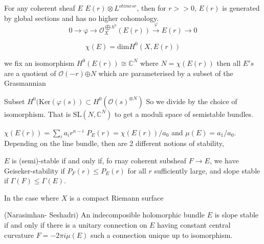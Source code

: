 For any coherent sheaf $E$  $E(r) \otimes L^{otimes r} $, 
then for $ r >> 0 $, $E(r) $ is generated by global sections and has no higher cohomology. 
\begin{equation}
    0 \rightarrow \mathrm{\varphi} \rightarrow \mathcal{O} _X ^{\bigoplus h^0} (E(r)) \xrightarrow{\varphi} E(r) \rightarrow 0 
\end{equation}

\begin{equation}
    \chi(E) = \mathrm{dim} H^0 (X, E(r)) 
\end{equation}

we fix an isomorphism $H^0 (E(r) ) \cong \mathbb{C} ^N $ where $ N = \chi(E(r))$
then all $ E's $ are a quotient of $ \mathcal{O} (-r) {\oplus N } $ which are parameterised by a subset of the Grasmannian 

Subset $ H ^0 ( \mathrm{Ker}(\varphi(s) ) \subset H^0 ( \mathcal{O} (s) ^{\otimes N} )$ 
So we divide by the choice of isomorphism. 
That is $ \mathrm{SL}(N, \mathbb{C}  ^N ) $ to get a moduli space of semistable bundles. 

$\chi ( E(r) ) = \sum _i a_i r^{n-i} $
$P_E (r) = \chi(E(r))/ a_0 $ and $\mu (E) = a_1/ a_0 $. 
Depending on the line bundle, then  are 2 different notions of stability,

$ E$ is (semi)-stable if and only if, fo rnay coherent subsheaf $ F \rightarrow  E$, 
we have Geiseker-stability if $P_F ( r) \leq P_E (r) $ for all $r$ sufficiently large, 
and slope stable if $ \Gamma(F) \leq \Gamma(E) $. 

In the case where $ X $ is a compact Riemann surface 
\begin{theorem}
    (Narasimhan- Seshadri) 
    An indecomposible holomorphic bundle $E$ is slope stable if and only if there is a unitary connection 
    on $E$ having constant central curvature $ F = -2 \pi i \mu (E) $ such a connection unique up to isomorphism. 
\end{theorem}





 

